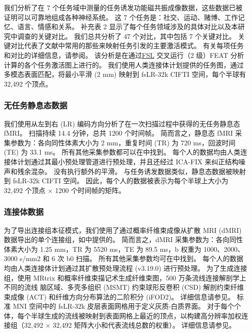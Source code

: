 \documentclass[lang=cn,a4paper,newtx]{elegantpaper}
\begin{document}
我们分析了在 7 个任务域中测量的任务诱发功能磁共振成像数据，这些数据已被证明可以可靠地组成各种神经系统\cite{barch2013function}。
这 7 个任务是：社交、运动、赌博、工作记忆、语言、情感和关系。
补充表 2 显示了每个任务领域涉及的具体对比以及本研究中调查的关键对比。
我们总共分析了 47 个对比，其中包括 7 个关键对比。
关键对比代表了文献中常用的那些来映射任务引发的主要激活模式。
有关每项任务和对比的详细信息，请参阅\cite{barch2013function}。
该分析是在通过\href{https://fsl.fmrib.ox.ac.uk/}{FSL} 交叉运行（2 级）FEAT 分析\cite{woolrich2004multilevel}计算的各个任务激活图上进行的。
我们使用人类连接体计划提供的任务图，通过多模态表面匹配\cite{robinson2018multimodal}，将最小平滑 (2 mm) 映射到 fsLR-32k CIFTI 空间，每个半球有 32,492 个顶点。


\subsubsection{无任务静息态数据} \label{sec:sup_2_2}
我们使用从左到右 (LR) 编码方向分析了在一次扫描过程中获得的无任务静息态 fMRI。
扫描持续 14.4 分钟，总共 1200 个时间帧。
简而言之，静息态 fMRI 采集参数为：各向同性体素大小为 2 mm，重复时间 (TR) 为 720 ms，回波时间 (TE) 为 33.1 ms。
所有其他采集参数都可以在\cite{van2013wu}中找到。
每个人的数据均由人类连接体计划通过其最小预处理管道进行预处理\cite{glasser2013minimal}，并且还经过 ICA-FIX 来纠正结构噪声和残余混杂\cite{salimi2014automatic}。
没有执行额外的平滑。
与任务诱发数据类似，静息态数据被映射到 fsLR-32k CIFTI 空间。
因此，每个人的数据被表示为每个半球上大小为 32,492 个顶点 × 1200 个时间帧的矩阵。


\subsubsection{连接体数据} \label{sec:sup_2_3}

为了导出连接组本征模式，我们使用了通过概率纤维束成像从扩散 MRI (dMRI) 数据导出的单个连接组，如\cite{tian2021high}中提供的。
简而言之，dMRI 采集参数为：各向同性体素大小为 1.25 mm，TR 为 5520 ms，TE 为 89.5 ms，b 权重为 1000、2000、3000 s/mm2 和 6 次 b0 扫描。
所有其他采集参数均可在\cite{van2013wu}中找到。
每个人的数据均由人类连接体计划通过其扩散预处理流程 (v3.19.0) \cite{glasser2013minimal}进行预处理。
为了生成连接组，使用 MRtrix 和概率纤维束描记术生成纤维束图，500 万条流线连接解剖学上不同的流线 脑区域、多壳多组织 (MSMT) 约束球形反卷积 (CSD) 解剖约束纤维束成像 (ACT) 和纤维方向分布算法的二阶积分 (iFOD2)。
详细信息请参见\cite{tian2021high}。
标准 MNI 空间中的 fsLR-32k 皮层表面网格用于定义灰质-白质界面。
对于每个个体，每个半球生成的流线被映射到表面网格上最近的顶点，以构建高分辨率加权连接组（32,492 × 32,492 矩阵大小和代表流线总数的权重）。
详细信息请参见\cite{tian2021high}。
\end{document}
